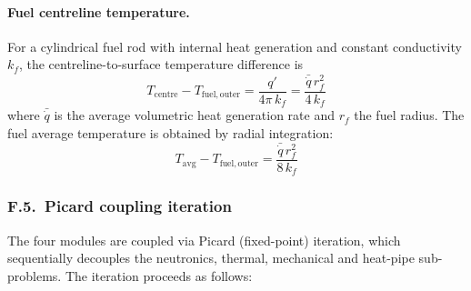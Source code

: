 \documentclass[11pt,a4paper]{article}
\begin{document}
\paragraph{Fuel centreline temperature.}
For a cylindrical fuel rod with internal heat generation and constant
conductivity $k_f$, the centreline-to-surface temperature difference is
\begin{equation}
T_{\mathrm{centre}} - T_{\mathrm{fuel,outer}}
= \frac{q'}{4\pi\,k_f}
= \frac{\bar{\dot{q}}\,r_f^2}{4\,k_f}
\end{equation}
where $\bar{\dot{q}}$ is the average volumetric heat generation rate
and $r_f$ the fuel radius. The fuel average temperature is obtained by
radial integration:
\begin{equation}
T_{\mathrm{avg}} - T_{\mathrm{fuel,outer}}
= \frac{\bar{\dot{q}}\,r_f^2}{8\,k_f}
\end{equation}


\subsubsection*{F.5.~Picard coupling iteration}

The four modules are coupled via Picard (fixed-point) iteration, which
sequentially decouples the neutronics, thermal, mechanical and heat-pipe
sub-problems. The iteration proceeds as follows:
\end{document}
